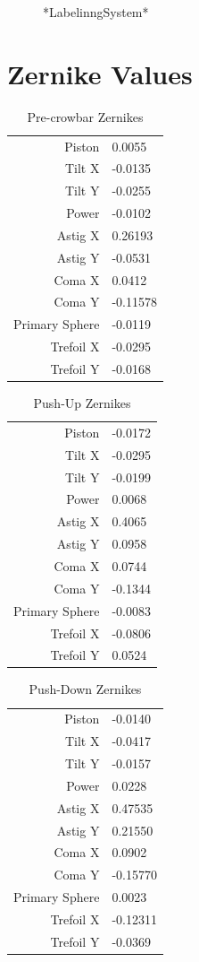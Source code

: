 \documentclass{article}
\begin{document}
\begin{figure}
	\caption{*LabelinngSystem*}
	\label{alltestsminref}
\end{figure}

\section{Zernike Values}
\begin{table}[H]
	\centering
	\begin{tabular}{r|p{1in}} \hline
		Piston &0.0055 \\
		Tilt X &-0.0135\\
		Tilt Y &-0.0255\\
		Power &-0.0102\\
		Astig X &0.26193\\
		Astig Y &-0.0531\\
		Coma X &0.0412\\
		Coma Y &-0.11578\\
		Primary Sphere &-0.0119\\
		Trefoil X &-0.0295\\
		Trefoil Y &-0.0168
	\end{tabular}
	\caption{Pre-crowbar Zernikes}
	\label{precrowbar}
\end{table}
\begin{table}[H]
	\centering
	\begin{tabular}{r|p{1in}} \hline
		Piston &-0.0172 \\
		Tilt X &-0.0295\\
		Tilt Y &-0.0199\\
		Power &0.0068\\
		Astig X &0.4065\\
		Astig Y &0.0958\\
		Coma X &0.0744\\
		Coma Y &-0.1344\\
		Primary Sphere &-0.0083\\
		Trefoil X &-0.0806\\
		Trefoil Y &0.0524
	\end{tabular}
	\caption{Push-Up Zernikes}
	\label{pushup}
\end{table}
\begin{table}[H]
	\centering
	\begin{tabular}{r|p{1in}} \hline
		Piston &-0.0140 \\
		Tilt X &-0.0417\\
		Tilt Y &-0.0157\\
		Power & 0.0228\\
		Astig X & 0.47535\\
		Astig Y & 0.21550\\
		Coma X & 0.0902\\
		Coma Y &-0.15770\\
		Primary Sphere &0.0023\\
		Trefoil X &-0.12311\\
		Trefoil Y &-0.0369
	\end{tabular}
	\caption{Push-Down Zernikes}
	\label{pushdown}
\end{table}
\end{document}
